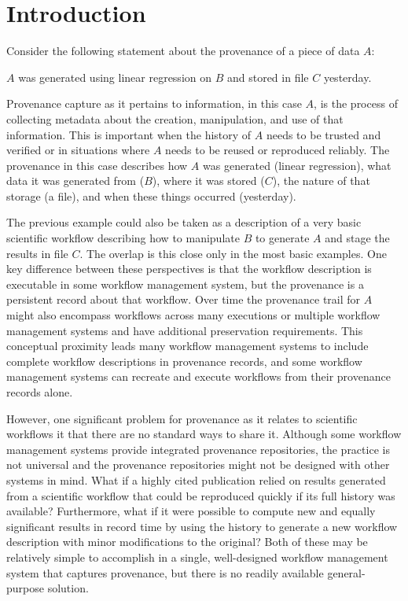 \section{Introduction}
Consider the following statement about the provenance of a piece of data $A$:
\begin{displayquote}
    $A$ was generated using linear regression on $B$ and stored in file $C$ yesterday.
\end{displayquote}
Provenance capture as it pertains to information, in this case $A$, is the process of collecting metadata about the creation, manipulation, and use of that information. This is important when the history of $A$ needs to be trusted and verified or in situations where $A$ needs to be reused or reproduced reliably. The provenance in this case describes how $A$ was generated (linear regression), what data it was generated from ($B$), where it was stored ($C$), the nature of that storage (a file), and when these things occurred (yesterday). 

The previous example could also be taken as a description of a very basic scientific workflow describing how to manipulate $B$ to generate $A$ and stage the results in file $C$. The overlap is this close only in the most basic examples. One key difference between these perspectives is that the workflow description is executable in some workflow management system, but the provenance is a persistent record about that workflow. Over time the provenance trail for $A$ might also encompass workflows across many executions or multiple workflow management systems and have additional preservation requirements. This conceptual proximity leads many workflow management systems to include complete workflow descriptions in provenance records, and some workflow management systems can recreate and execute workflows from their provenance records alone.

However, one significant problem for provenance as it relates to scientific workflows it that there are no standard ways to share it. Although some workflow management systems provide integrated provenance repositories, the practice is not universal and the provenance repositories might not be designed with other systems in mind. What if a highly cited publication relied on results generated from a scientific workflow that could be reproduced quickly if its full history was available? Furthermore, what if it were possible to compute new and equally significant results in record time by using the history to generate a new workflow description with minor modifications to the original? Both of these may be relatively simple to accomplish in a single, well-designed workflow management system that captures provenance, but there is no readily available general-purpose solution.

